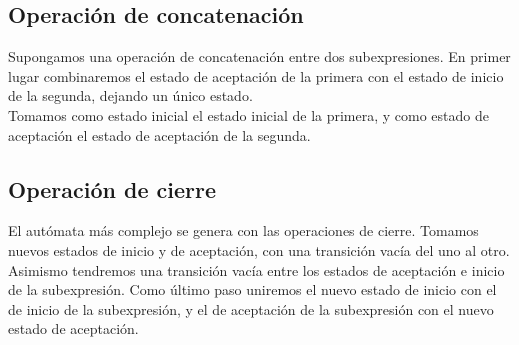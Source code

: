 
\subsection{Operación de concatenación}
Supongamos una operación de concatenación entre dos subexpresiones.
En primer lugar combinaremos el estado de aceptación de la primera con el estado de inicio de la segunda, dejando un único estado.
\\
Tomamos como estado inicial el estado inicial de la primera, y como estado de aceptación el estado de aceptación de la segunda.


\subsection{Operación de cierre}
El autómata más complejo se genera con las operaciones de cierre.
Tomamos nuevos estados de inicio y de aceptación, con una transición vacía del uno al otro.
Asimismo tendremos una transición vacía entre los estados de aceptación e inicio de la subexpresión.
Como último paso uniremos el nuevo estado de inicio con el de inicio de la subexpresión, y el de aceptación de la subexpresión con el nuevo estado de aceptación.

